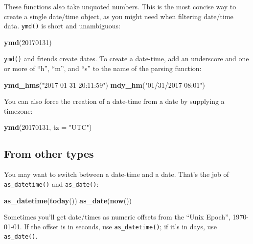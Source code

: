 \documentclass[]{book}
\newenvironment{Shaded}{\begin{snugshade}}{\end{snugshade}}
\newcommand{\KeywordTok}[1]{\textcolor[rgb]{0.13,0.29,0.53}{\textbf{#1}}}
\newcommand{\DataTypeTok}[1]{\textcolor[rgb]{0.13,0.29,0.53}{#1}}
\newcommand{\DecValTok}[1]{\textcolor[rgb]{0.00,0.00,0.81}{#1}}
\newcommand{\StringTok}[1]{\textcolor[rgb]{0.31,0.60,0.02}{#1}}
\newcommand{\NormalTok}[1]{#1}
\begin{document}
These functions also take unquoted numbers. This is the most concise way
to create a single date/time object, as you might need when filtering
date/time data. \texttt{ymd()} is short and unambiguous:

\begin{Shaded}
\begin{Highlighting}[]
\KeywordTok{ymd}\NormalTok{(}\DecValTok{20170131}\NormalTok{)}
\end{Highlighting}
\end{Shaded}

\texttt{ymd()} and friends create dates. To create a date-time, add an
underscore and one or more of ``h'', ``m'', and ``s'' to the name of the
parsing function:

\begin{Shaded}
\begin{Highlighting}[]
\KeywordTok{ymd_hms}\NormalTok{(}\StringTok{"2017-01-31 20:11:59"}\NormalTok{)}
\KeywordTok{mdy_hm}\NormalTok{(}\StringTok{"01/31/2017 08:01"}\NormalTok{)}
\end{Highlighting}
\end{Shaded}

You can also force the creation of a date-time from a date by supplying
a timezone:

\begin{Shaded}
\begin{Highlighting}[]
\KeywordTok{ymd}\NormalTok{(}\DecValTok{20170131}\NormalTok{, }\DataTypeTok{tz =} \StringTok{"UTC"}\NormalTok{)}
\end{Highlighting}
\end{Shaded}

\subsection{From other types}\label{from-other-types}

You may want to switch between a date-time and a date. That's the job of
\texttt{as\_datetime()} and \texttt{as\_date()}:

\begin{Shaded}
\begin{Highlighting}[]
\KeywordTok{as_datetime}\NormalTok{(}\KeywordTok{today}\NormalTok{())}
\KeywordTok{as_date}\NormalTok{(}\KeywordTok{now}\NormalTok{())}
\end{Highlighting}
\end{Shaded}

Sometimes you'll get date/times as numeric offsets from the ``Unix
Epoch'', 1970-01-01. If the offset is in seconds, use
\texttt{as\_datetime()}; if it's in days, use \texttt{as\_date()}.
\end{document}
